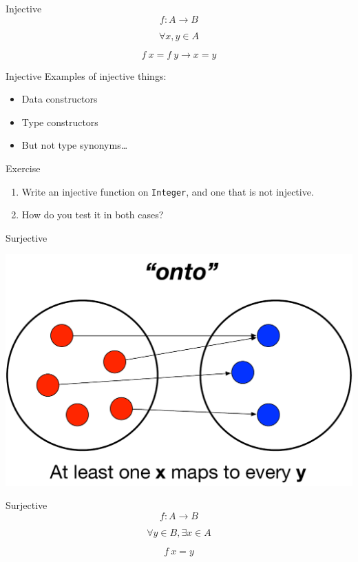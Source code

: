 \documentclass[utf8x,notes,17pt]{beamer}
\begin{document}
\begin{frame}[fragile,label=sec-4-4]{Injective}
\[ f : A → B \]

\[ ∀ x, y ∈ A \]

\[ f\ x = f\ y → x = y \]
\end{frame}
\begin{frame}[fragile,label=sec-4-5]{Injective}
Examples of injective things:

\begin{itemize}
\item Data constructors
\item Type constructors
\item But not type synonyms\dots{}
\end{itemize}
\end{frame}
\begin{frame}[fragile,label=sec-4-6]{Exercise}
\begin{enumerate}
\item Write an injective function on \texttt{Integer}, and one that is not
injective.

\item How do you test it in both cases?
\end{enumerate}
\end{frame}
\begin{frame}[fragile,label=sec-4-7]{Surjective}
\begin{center}
\includegraphics[width=.9\linewidth]{images/Mappings2.pdf}
\end{center}
\end{frame}
\begin{frame}[fragile,label=sec-4-8]{Surjective}
\[ f : A → B \]

\[ ∀ y ∈ B, ∃ x ∈ A \]

\[ f\ x = y \]
\end{frame}
\end{document}
